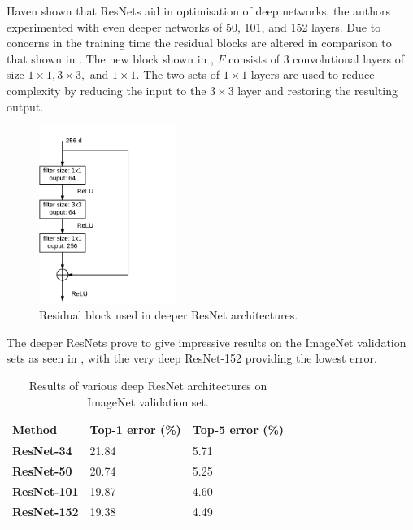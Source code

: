 Haven shown that ResNets aid in optimisation of deep networks, the authors experimented with even deeper networks of 50, 101, and 152 layers. Due to concerns in the training time the residual blocks are altered in comparison to that shown in . The new block shown in , $F$ consists of 3 convolutional layers of size $1 \times 1, 3 \times 3,$ and $1 \times 1$. The two sets of $1 \times 1$ layers are used to reduce complexity by reducing the input to the $3 \times 3$ layer and restoring the resulting output. 

\begin{figure}[H]
  \centering
    \includegraphics[width=0.4\textwidth]{Figs/Techanal/newresblock.pdf}
    \caption{Residual block used in deeper ResNet architectures.}
    \label{fig:newresblock}
\end{figure}


The deeper ResNets prove to give impressive results on the ImageNet validation sets as seen in , with the very deep ResNet-152 providing the lowest error.

\begin{table}[]
\centering
\caption{Results of various deep ResNet architectures on ImageNet validation set.}
\label{tab:deepresimagenet}
\begin{tabular}{|l|l|l|}
\hline
\textbf{Method}     & \textbf{Top-1 error (\%)} & \textbf{Top-5 error (\%)} \\ \hline
\textbf{ResNet-34}  & 21.84            & 5.71             \\ \hline
\textbf{ResNet-50}  & 20.74            & 5.25             \\ \hline
\textbf{ResNet-101} & 19.87            & 4.60             \\ \hline
\textbf{ResNet-152} & 19.38            & 4.49             \\ \hline
\end{tabular}
\end{table}

